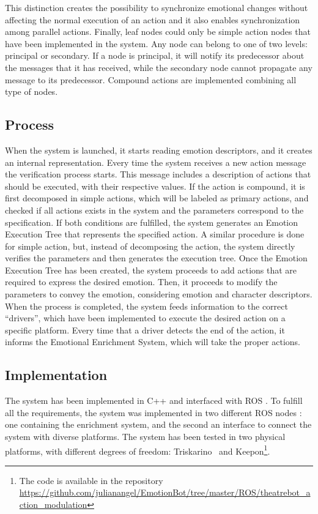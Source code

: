 \documentclass{sig-alternate-05-2015}
\begin{document}
This distinction creates the possibility to synchronize emotional changes without affecting the normal execution of an action and it also enables synchronization among parallel actions. Finally, leaf nodes could only be simple action nodes that have been implemented in the system. Any node can belong to one of two levels: principal or  secondary. If a node is principal, it will notify its predecessor about the messages that it has received, while the secondary node cannot propagate any message to its predecessor.%
Compound actions are implemented combining all type of nodes. 

\subsection{Process}

When the system is launched, it starts reading emotion descriptors, and it creates an internal representation. Every time the system receives a new action message the verification process starts. This message includes a description of actions that should be executed, with their respective values. If the action is compound, it is first decomposed in simple actions, which will be labeled as primary actions, and checked if all actions exists in the system and the parameters correspond to the specification. If both conditions are fulfilled, the system generates an Emotion Execution Tree that represents the specified action. A similar procedure is done for simple action, but, instead of decomposing the action, the system directly verifies the parameters and then generates the execution tree. Once the Emotion Execution Tree has been created, the system proceeds to add actions that are required to express the desired emotion. Then, it proceeds to modify the parameters to convey the emotion, considering emotion and character descriptors. When the process is completed, the system feeds information to the correct ``drivers'', which have been implemented to execute the desired action on a specific platform. Every time that a driver detects the end of the action, it informs the Emotional Enrichment System, which will take the proper actions.

\subsection{Implementation}

The system has been implemented in C++ and interfaced with ROS %
. To fulfill all the requirements, the system was implemented in two different ROS nodes %
: one containing the enrichment system, and the second an interface to connect the system with diverse platforms. The system has been tested in two physical platforms, with different degrees of freedom: Triskarino~\cite{angel2013}
 and Keepon\footnote{ The code is available in the repository \url{https://github.com/julianangel/EmotionBot/tree/master/ROS/theatrebot_action_modulation}}. 
 
\end{document}
